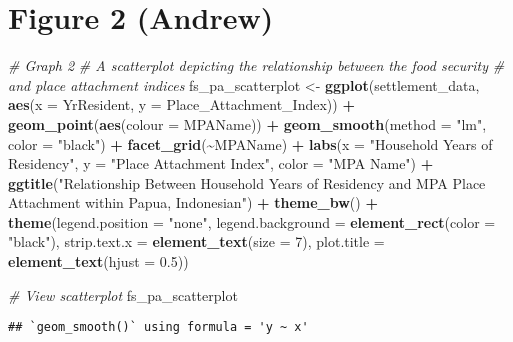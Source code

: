 \documentclass[
]{article}
\newenvironment{Shaded}{\begin{snugshade}}{\end{snugshade}}
\newcommand{\AttributeTok}[1]{\textcolor[rgb]{0.13,0.29,0.53}{#1}}
\newcommand{\CommentTok}[1]{\textcolor[rgb]{0.56,0.35,0.01}{\textit{#1}}}
\newcommand{\DecValTok}[1]{\textcolor[rgb]{0.00,0.00,0.81}{#1}}
\newcommand{\FloatTok}[1]{\textcolor[rgb]{0.00,0.00,0.81}{#1}}
\newcommand{\FunctionTok}[1]{\textcolor[rgb]{0.13,0.29,0.53}{\textbf{#1}}}
\newcommand{\NormalTok}[1]{#1}
\newcommand{\OtherTok}[1]{\textcolor[rgb]{0.56,0.35,0.01}{#1}}
\newcommand{\SpecialCharTok}[1]{\textcolor[rgb]{0.81,0.36,0.00}{\textbf{#1}}}
\newcommand{\StringTok}[1]{\textcolor[rgb]{0.31,0.60,0.02}{#1}}
\begin{document}
\section{Figure 2 (Andrew)}\label{figure-2-andrew}

\begin{Shaded}
\begin{Highlighting}[]
\CommentTok{\# Graph 2}
\CommentTok{\# A scatterplot depicting the relationship between the food security }
\CommentTok{\# and place attachment indices}
\NormalTok{fs\_pa\_scatterplot }\OtherTok{\textless{}{-}} \FunctionTok{ggplot}\NormalTok{(settlement\_data, }\FunctionTok{aes}\NormalTok{(}\AttributeTok{x =}\NormalTok{ YrResident,}
                            \AttributeTok{y =}\NormalTok{ Place\_Attachment\_Index)) }\SpecialCharTok{+}
  \FunctionTok{geom\_point}\NormalTok{(}\FunctionTok{aes}\NormalTok{(}\AttributeTok{colour =}\NormalTok{ MPAName)) }\SpecialCharTok{+}
  \FunctionTok{geom\_smooth}\NormalTok{(}\AttributeTok{method =} \StringTok{"lm"}\NormalTok{, }\AttributeTok{color =} \StringTok{"black"}\NormalTok{) }\SpecialCharTok{+}
  \FunctionTok{facet\_grid}\NormalTok{(}\SpecialCharTok{\textasciitilde{}}\NormalTok{MPAName) }\SpecialCharTok{+}
  \FunctionTok{labs}\NormalTok{(}\AttributeTok{x =} \StringTok{"Household Years of Residency"}\NormalTok{,}
       \AttributeTok{y =} \StringTok{"Place Attachment Index"}\NormalTok{,}
       \AttributeTok{color =} \StringTok{"MPA Name"}\NormalTok{) }\SpecialCharTok{+}
  \FunctionTok{ggtitle}\NormalTok{(}\StringTok{"Relationship Between Household Years of Residency }
\StringTok{and MPA Place Attachment within Papua, Indonesian"}\NormalTok{) }\SpecialCharTok{+}
  \FunctionTok{theme\_bw}\NormalTok{() }\SpecialCharTok{+}
  \FunctionTok{theme}\NormalTok{(}\AttributeTok{legend.position =} \StringTok{"none"}\NormalTok{,}
        \AttributeTok{legend.background =} \FunctionTok{element\_rect}\NormalTok{(}\AttributeTok{color =} \StringTok{"black"}\NormalTok{),}
        \AttributeTok{strip.text.x =} \FunctionTok{element\_text}\NormalTok{(}\AttributeTok{size =} \DecValTok{7}\NormalTok{),}
        \AttributeTok{plot.title =} \FunctionTok{element\_text}\NormalTok{(}\AttributeTok{hjust =} \FloatTok{0.5}\NormalTok{))}

\CommentTok{\# View scatterplot}
\NormalTok{fs\_pa\_scatterplot}
\end{Highlighting}
\end{Shaded}

\begin{verbatim}
## `geom_smooth()` using formula = 'y ~ x'
\end{verbatim}
\end{document}
